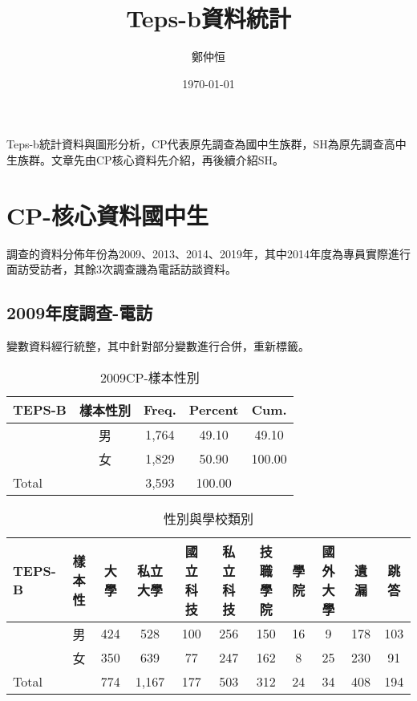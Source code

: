 \documentclass[12pt, a4paper]{article}
\title{ Teps-b資料統計}
\author{{\SM 鄭仲恒}}
\date{{\TT \today}}
\begin{document}
\maketitle
\fontsize{12}{22 pt}\selectfont
Teps-b統計資料與圖形分析，CP代表原先調查為國中生族群，SH為原先調查高中生族群。文章先由CP核心資料先介紹，再後續介紹SH。



\section{CP-核心資料國中生}
調查的資料分佈年份為2009、2013、2014、2019年，其中2014年度為專員實際進行面訪受訪者，其餘3次調查譏為電話訪談資料。
\subsection{2009年度調查-電訪}
變數資料經行統整，其中針對部分變數進行合併，重新標籤。

\begin{table}[htbp]
  \centering
   \caption{2009CP-樣本性別}
  \begin{adjustbox}{width=0.5\textwidth}
    \begin{tabular}{lcccc}
      \toprule
      TEPS-B & 樣本性別 & Freq. & Percent & Cum. \\
      \midrule
      & 男 & 1,764 & 49.10 & 49.10 \\
      & 女 & 1,829 & 50.90 & 100.00 \\
      \midrule
      Total & & 3,593 & 100.00 & \\
      \bottomrule
    \end{tabular}
  \end{adjustbox}
\end{table}

\bigskip

\begin{table}[htbp]
  \centering
  \caption{性別與學校類別}
  \begin{adjustbox}{width=\textwidth}
    \begin{tabular}{lcccccccccc}
      \toprule
      TEPS-B & 樣本性 & 大學 & 私立大學 & 國立科技 & 私立科技 & 技職學院 & 學院 & 國外大學 & 遺漏 & 跳答 \\
      \midrule
      & 男 & 424 & 528 & 100 & 256 & 150 & 16 & 9 & 178 & 103 \\
      & 女 & 350 & 639 & 77 & 247 & 162 & 8 & 25 & 230 & 91 \\
      \midrule
      Total & & 774 & 1,167 & 177 & 503 & 312 & 24 & 34 & 408 & 194 \\
      \bottomrule
    \end{tabular}
  \end{adjustbox}
\end{table}
\end{document}
